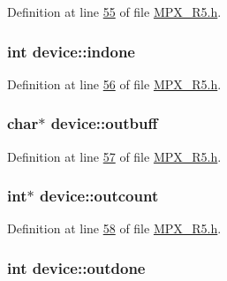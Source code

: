 Definition at line \hyperlink{_m_p_x___r5_8h_source_l00055}{55} of file \hyperlink{_m_p_x___r5_8h_source}{MPX\_\-R5.h}.

\hypertarget{structdevice_aff338e9d555a8f740e997650a862b523}{
\subsubsection[{indone}]{\setlength{\rightskip}{0pt plus 5cm}int {\bf device::indone}}}
\label{structdevice_aff338e9d555a8f740e997650a862b523}


Definition at line \hyperlink{_m_p_x___r5_8h_source_l00056}{56} of file \hyperlink{_m_p_x___r5_8h_source}{MPX\_\-R5.h}.

\hypertarget{structdevice_a32acea82810b51d93df2d3ced6cdffb7}{
\subsubsection[{outbuff}]{\setlength{\rightskip}{0pt plus 5cm}char$\ast$ {\bf device::outbuff}}}
\label{structdevice_a32acea82810b51d93df2d3ced6cdffb7}


Definition at line \hyperlink{_m_p_x___r5_8h_source_l00057}{57} of file \hyperlink{_m_p_x___r5_8h_source}{MPX\_\-R5.h}.

\hypertarget{structdevice_ae597c46dee282a47174100b12525b424}{
\subsubsection[{outcount}]{\setlength{\rightskip}{0pt plus 5cm}int$\ast$ {\bf device::outcount}}}
\label{structdevice_ae597c46dee282a47174100b12525b424}


Definition at line \hyperlink{_m_p_x___r5_8h_source_l00058}{58} of file \hyperlink{_m_p_x___r5_8h_source}{MPX\_\-R5.h}.

\hypertarget{structdevice_ab7c43127bcb340d678131fd04c37ba05}{
\subsubsection[{outdone}]{\setlength{\rightskip}{0pt plus 5cm}int {\bf device::outdone}}}
\label{structdevice_ab7c43127bcb340d678131fd04c37ba05}


